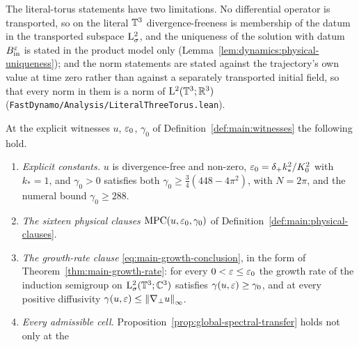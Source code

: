 The literal-torus statements have two limitations.  No differential operator is transported, so on the literal
$\mathbb{T}^3$ divergence-freeness is membership of the datum in the transported subspace
$\mathrm{L}^2_\sigma$, and the uniqueness of the solution with datum $B_{\rm in}^\varepsilon$ is stated in
the product model only (Lemma~\ref{lem:dynamics:physical-uniqueness}); and the norm statements
are stated against the trajectory's own value at time zero rather than against a separately
transported initial field, so that every norm in them is a norm of
$\mathrm{L}^2(\mathbb{T}^3;\mathbb{R}^3)$
(\texttt{FastDynamo/Analysis/LiteralThreeTorus.lean}).

\begin{theorem}
  \label{thm:main-strengthened}
  \leanok
  At the explicit witnesses $u$, $\varepsilon_0$, $\gamma_0$ of
  Definition~\ref{def:main:witnesses} the following hold.
  \begin{enumerate}
    \item \emph{Explicit constants.}  $u$ is divergence-free and non-zero,
      $\varepsilon_0=\delta_+k_*^2/K_0^2$ with $k_*=1$, and $\gamma_0>0$ satisfies both
      $\gamma_0\geq\tfrac34(448-4\pi^2)$, with $N=2\pi$, and the numeral bound
      $\gamma_0\geq288$.
    \item \emph{The sixteen physical clauses} $\mathrm{MPC}(u,\varepsilon_0,\gamma_0)$
      of Definition~\ref{def:main:physical-clauses}.
    \item \emph{The growth-rate clause} \eqref{eq:main-growth-conclusion}, in
      the form of Theorem~\ref{thm:main-growth-rate}: for every
      $0<\varepsilon\leq\varepsilon_0$ the growth rate of the induction semigroup on
      $\mathrm{L}^2_\sigma(\mathbb{T}^3;\mathbb{C}^3)$ satisfies $\gamma(u,\varepsilon)\geq\gamma_0$, and at
      every positive diffusivity $\gamma(u,\varepsilon)\leq\left\|\nabla_\perp u\right\|_\infty$.
    \item \emph{Every admissible cell.}
      Proposition~\ref{prop:global-spectral-transfer} holds not only at the

\end{enumerate}
\end{theorem}
